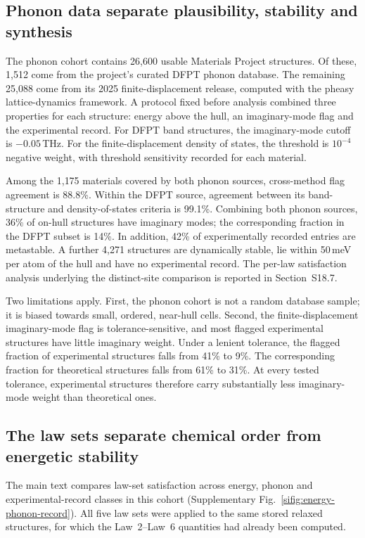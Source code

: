 \subsection{Phonon data separate plausibility, stability and synthesis}

The phonon cohort contains 26{,}600 usable Materials Project structures. Of these,
1{,}512 come from the project's curated DFPT phonon database. The remaining 25{,}088
come from its 2025 finite-displacement release, computed with the pheasy
lattice-dynamics framework. A protocol fixed before analysis combined three properties
for each structure: energy above the hull, an imaginary-mode flag and the experimental
record. For DFPT band structures, the imaginary-mode cutoff is $-0.05$\,THz. For the
finite-displacement density of states, the threshold is $10^{-4}$ negative weight, with
threshold sensitivity recorded for each material.

Among the 1{,}175 materials covered by both phonon sources, cross-method flag agreement
is 88.8\%. Within the DFPT source, agreement between its band-structure and
density-of-states criteria is 99.1\%. Combining both phonon sources, 36\% of on-hull
structures have imaginary modes;
the corresponding fraction in the DFPT subset is 14\%. In addition, 42\% of
experimentally recorded entries are metastable. A further 4{,}271 structures are
dynamically stable, lie within 50\,meV per atom of the hull and have no experimental
record. The per-law satisfaction analysis underlying the distinct-site comparison is
reported in Section~S18.7.

Two limitations apply. First, the phonon cohort is not a random database sample; it is
biased towards small, ordered, near-hull cells. Second, the finite-displacement
imaginary-mode flag is tolerance-sensitive, and most flagged experimental structures
have little imaginary weight. Under a lenient tolerance, the flagged fraction of
experimental structures falls from 41\% to 9\%. The corresponding fraction for
theoretical structures falls from 61\% to 31\%. At every tested tolerance, experimental
structures therefore carry substantially less imaginary-mode weight than theoretical
ones.

\subsection{The law sets separate chemical order from energetic stability}

The main text compares law-set satisfaction across energy, phonon and
experimental-record classes in this cohort (Supplementary
Fig.~\ref{sifig:energy-phonon-record}). All five law sets were applied to the same stored
relaxed structures, for which the Law~2--Law~6 quantities had already been computed.

